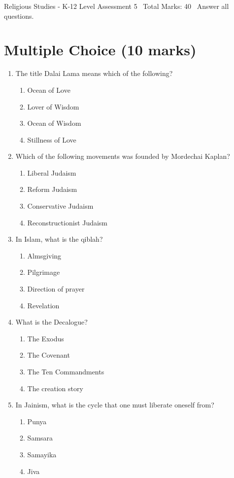 \documentclass[12pt]{article}
\begin{document}
\begin{center}
Religious Studies - K-12 Level Assessment 5 \
Total Marks: 40 \
Answer all questions.
\end{center}

\section*{Multiple Choice (10 marks)}
\begin{enumerate}[label=\arabic*.]
\item The title Dalai Lama means which of the following?
\begin{enumerate}[label=(\alph*)]
    \item Ocean of Love
    \item Lover of Wisdom
    \item Ocean of Wisdom
    \item Stillness of Love
\end{enumerate}
\item Which of the following movements was founded by Mordechai Kaplan?
\begin{enumerate}[label=(\alph*)]
    \item Liberal Judaism
    \item Reform Judaism
    \item Conservative Judaism
    \item Reconstructionist Judaism
\end{enumerate}
\item In Islam, what is the qiblah?
\begin{enumerate}[label=(\alph*)]
    \item Almsgiving
    \item Pilgrimage
    \item Direction of prayer
    \item Revelation
\end{enumerate}
\item What is the Decalogue?
\begin{enumerate}[label=(\alph*)]
    \item The Exodus
    \item The Covenant
    \item The Ten Commandments
    \item The creation story
\end{enumerate}
\item In Jainism, what is the cycle that one must liberate oneself from?
\begin{enumerate}[label=(\alph*)]
    \item Punya
    \item Samsara
    \item Samayika
    \item Jiva
\end{enumerate}
\end{enumerate}
\end{document}
